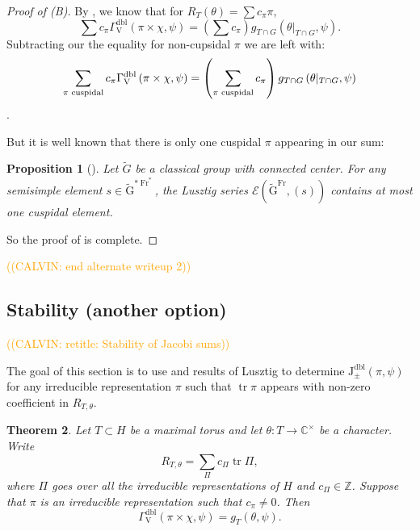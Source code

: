 \documentclass[12pt, reqno]{amsart}
\newtheorem{theorem}{Theorem}[section]
\newtheorem{proposition}[theorem]{Proposition}
\theoremstyle{definition}
\theoremstyle{definition}
\theoremstyle{definition}
\newcommand{\zIntegers}{\mathbb{Z}}
\newcommand{\cComplex}{\mathbb{C}}
\newcommand{\multiplicativegroup}[1]{#1^{\times}}
\newcommand{\hermitianSpace}{\mathrm{V}}
\newcommand{\fieldCharacter}{\psi}
\newcommand{\trace}{\operatorname{tr}}
\newcommand{\GroupExtension}[1]{\widetilde{#1}}
\newcommand{\Frobenius}{\operatorname{Fr}}
\newcommand{\dblJacobiSumScalar}[2]{\mathrm{J}_{\pm}^{\mathrm{dbl}}\left(#1, #2\right)}
\newcommand{\dblGammaFactorSpace}[4]{\Gamma^{\mathrm{dbl}}_{#1}\left(#2 \times #3, #4\right)}
\newcommand{\algebraicGroup}[1]{\boldsymbol{\mathrm{#1}}}
\newcommand{\LusztigSeries}[2]{\mathcal{E}\left(#1, (#2)\right)}
\newcommand{\DualFrobeniusFixedPoints}[2][\Frobenius^{\ast}]{\algebraicGroup{#2}^{\ast #1}}
\newcommand{\FrobeniusFixedPoints}[2][\Frobenius]{\algebraicGroup{#2}^{#1}}
\newcommand{\calvin}[1]{\textcolor{orange}{\sffamily ((CALVIN: #1))}}
\begin{document}
\begin{proof}[Proof of (B)]
By , we know that for $R_T(\theta) = \sum c_{\pi} \pi$, 
$$\sum c_{\pi} \dblGammaFactorSpace{\hermitianSpace}{\pi}{\chi}{\fieldCharacter} = (\sum c_{\pi})g_{T \cap G}\left(\theta|_{T \cap G}, \fieldCharacter\right).$$Subtracting our the equality for non-cupsidal $\pi$ we are left with:
$$ \sum_{\pi \textnormal{ cuspidal}} c_{\pi} \dblGammaFactorSpace{\hermitianSpace}{\pi}{\chi}{\fieldCharacter} = \left(\sum_{\pi \textnormal{ cuspidal}} c_{\pi}\right)g_{T \cap G}\left(\theta|_{T \cap G}, \fieldCharacter\right)$$.

But it is well known that there is only one cuspidal $\pi$ appearing in our sum:
\begin{proposition}[{\cite[Page 172]{Lusztig1977}}]
	Let $\GroupExtension{G}$ be a classical group with connected center. For any semisimple element $s \in \DualFrobeniusFixedPoints{\GroupExtension{G}}$, the Lusztig series $\LusztigSeries{\FrobeniusFixedPoints{\GroupExtension{G}}}{s}$ contains at most one cuspidal element.
\end{proposition}

So the proof of  is complete.
\end{proof}
\calvin{end alternate writeup 2}

\subsection{Stability (another option)}
\calvin{retitle: Stability of Jacobi sums}

The goal of this section is to use  and results of Lusztig to determine $\dblJacobiSumScalar{\pi}{\fieldCharacter}$ for any irreducible representation $\pi$ such that $\trace \pi$ appears with non-zero coefficient in $R_{T,\theta}$.

\begin{theorem}\label{thm:doubling-method-gamma-factor-for-deligne-lusztig}
	Let $T \subset H$ be a maximal torus and let $\theta \colon T \to \multiplicativegroup{\cComplex}$ be a character. Write $$R_{T,\theta} = \sum_{\Pi} c_{\Pi} \trace \Pi,$$
	where $\Pi$ goes over all the irreducible representations of $H$ and $c_{\Pi} \in \zIntegers$. Suppose that $\pi$ is an irreducible representation such that $c_{\pi} \ne 0$. Then $$\dblGammaFactorSpace{\hermitianSpace}{\pi}{\chi}{\fieldCharacter} = g_T\left(\theta, \fieldCharacter\right).$$
\end{theorem}
\end{document}
